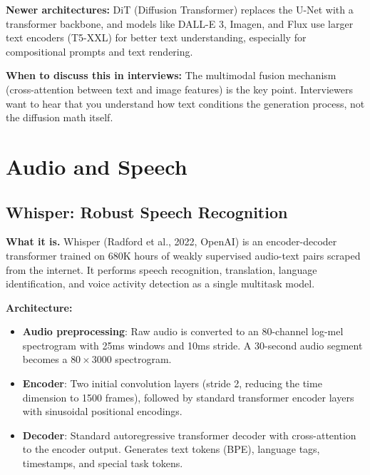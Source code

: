 \textbf{Newer architectures:} DiT (Diffusion Transformer) replaces the U-Net with a transformer backbone, and models like DALL-E 3, Imagen, and Flux use larger text encoders (T5-XXL) for better text understanding, especially for compositional prompts and text rendering.

\textbf{When to discuss this in interviews:} The multimodal fusion mechanism (cross-attention between text and image features) is the key point. Interviewers want to hear that you understand how text conditions the generation process, not the diffusion math itself.

\section{Audio and Speech}
\label{sec:audio_speech}

\subsection{Whisper: Robust Speech Recognition}

\textbf{What it is.} Whisper (Radford et al., 2022, OpenAI) is an encoder-decoder transformer trained on 680K hours of weakly supervised audio-text pairs scraped from the internet. It performs speech recognition, translation, language identification, and voice activity detection as a single multitask model.

\textbf{Architecture:}
\begin{itemize}
    \item \textbf{Audio preprocessing}: Raw audio is converted to an 80-channel log-mel spectrogram with 25ms windows and 10ms stride. A 30-second audio segment becomes a $80 \times 3000$ spectrogram.
    \item \textbf{Encoder}: Two initial convolution layers (stride 2, reducing the time dimension to 1500 frames), followed by standard transformer encoder layers with sinusoidal positional encodings.
    \item \textbf{Decoder}: Standard autoregressive transformer decoder with cross-attention to the encoder output. Generates text tokens (BPE), language tags, timestamps, and special task tokens.
\end{itemize}

